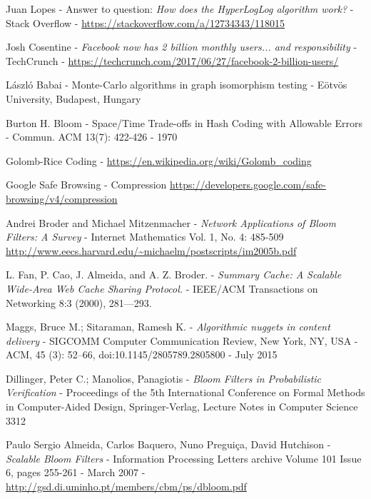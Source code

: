\begin{thebibliography}{99}
	Juan Lopes -
	Answer to question: \emph{How does the HyperLogLog algorithm work?} -
	Stack Overflow -
	\url{https://stackoverflow.com/a/12734343/118015}

	Josh Cosentine -
	\emph{Facebook now has 2 billion monthly users... and responsibility} -
	TechCrunch -
	\url{https://techcrunch.com/2017/06/27/facebook-2-billion-users/}

	László Babai -
 	Monte-Carlo algorithms in graph isomorphism testing -
 	Eötvös University, Budapest, Hungary

	Burton H. Bloom -
	Space/Time Trade-offs in Hash Coding with Allowable Errors -
	Commun. ACM 13(7): 422-426 -
	1970

	Golomb-Rice Coding -
	\url{https://en.wikipedia.org/wiki/Golomb_coding}

	Google Safe Browsing - Compression
	\url{https://developers.google.com/safe-browsing/v4/compression}

	Andrei Broder and Michael Mitzenmacher -
	\emph{Network Applications of Bloom Filters: A Survey} -
	Internet Mathematics Vol. 1, No. 4: 485-509
	\url{http://www.eecs.harvard.edu/~michaelm/postscripts/im2005b.pdf}

	L. Fan, P. Cao, J. Almeida, and A. Z. Broder. -
	\emph{Summary Cache: A Scalable Wide-Area Web Cache Sharing Protocol.} -
	IEEE/ACM Transactions on Networking 8:3 (2000), 281—293.

	Maggs, Bruce M.; Sitaraman, Ramesh K. -
	\emph{Algorithmic nuggets in content delivery} -
	SIGCOMM Computer Communication Review, New York, NY, USA -
	ACM, 45 (3): 52–66, doi:10.1145/2805789.2805800 -
	July 2015

	Dillinger, Peter C.; Manolios, Panagiotis - 
	\emph{Bloom Filters in Probabilistic Verification} -
	Proceedings of the 5th International Conference on Formal Methods in Computer-Aided Design, Springer-Verlag, Lecture Notes in Computer Science 3312

	Paulo Sergio Almeida, Carlos Baquero, Nuno Preguiça, David Hutchison -
	\emph{Scalable Bloom Filters} -
	Information Processing Letters archive Volume 101 Issue 6, pages 255-261 -
	March 2007 -
	\url{http://gsd.di.uminho.pt/members/cbm/ps/dbloom.pdf}

\end{thebibliography}
